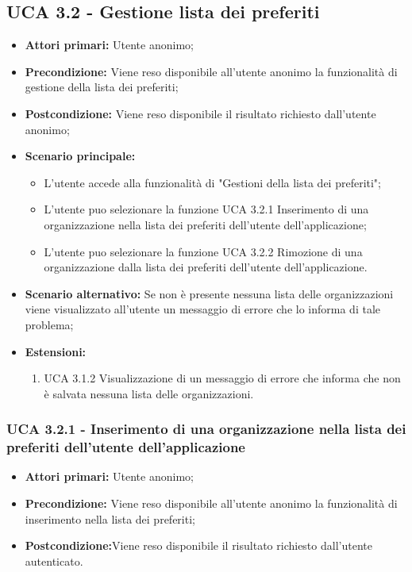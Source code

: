\subsection{UCA 3.2 - Gestione lista dei preferiti}%

\begin{itemize}
	\item \textbf{Attori primari:} Utente anonimo;
	\item \textbf{Precondizione:} Viene reso disponibile all’utente anonimo la funzionalità di gestione della lista dei preferiti; 
	\item \textbf{Postcondizione:} Viene reso disponibile il risultato richiesto dall’utente anonimo;
	\item \textbf{Scenario principale:}
			\begin{itemize}
			\item L’utente accede alla funzionalità di "Gestioni della lista dei preferiti";
			\item L'utente puo selezionare la funzione UCA 3.2.1 Inserimento di una organizzazione nella lista dei preferiti dell’utente dell’applicazione;
			\item L'utente puo selezionare la funzione UCA 3.2.2 Rimozione di una organizzazione dalla lista dei preferiti dell’utente dell’applicazione.
			\end{itemize}
	\item \textbf{Scenario alternativo:} Se non è presente nessuna lista delle organizzazioni viene visualizzato all’utente un messaggio di errore che lo informa di tale problema;
	\item \textbf{Estensioni:}
	\begin{enumerate}
		\item UCA 3.1.2 Visualizzazione di un messaggio di errore che informa che non è salvata nessuna lista delle organizzazioni.
	\end{enumerate}
\end{itemize}

\subsubsection{UCA 3.2.1 - Inserimento di una organizzazione nella lista dei preferiti dell’utente dell’applicazione}%
\begin{itemize}
	\item \textbf{Attori primari:} Utente anonimo;
	\item \textbf{Precondizione:} Viene reso disponibile all’utente anonimo la funzionalità di inserimento nella lista dei preferiti; 
	\item \textbf{Postcondizione:}Viene reso disponibile il risultato richiesto dall’utente autenticato.
\end{itemize}

